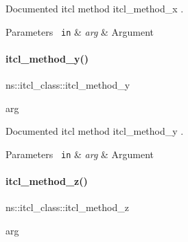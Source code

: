Documented itcl method {\ttfamily itcl\+\_\+method\+\_\+x} . 


\begin{DoxyParams}[1]{Parameters}
\mbox{\texttt{ in}}  & {\em arg} & Argument \\
\hline
\end{DoxyParams}

\begin{DoxyCode}{0}

\end{DoxyCode}
\mbox{\label{classns_1_1itcl__class_a092d0f8ed4796902e41fbeb1dfed82f1}} 
\paragraph{\texorpdfstring{itcl\_method\_y()}{itcl\_method\_y()}}
{\footnotesize\ttfamily ns\+::itcl\+\_\+class\+::itcl\+\_\+method\+\_\+y\begin{DoxyParamCaption}\item[{}]{arg  }\end{DoxyParamCaption}}



Documented itcl method {\ttfamily itcl\+\_\+method\+\_\+y} . 


\begin{DoxyParams}[1]{Parameters}
\mbox{\texttt{ in}}  & {\em arg} & Argument \\
\hline
\end{DoxyParams}

\begin{DoxyCode}{0}

\end{DoxyCode}
\mbox{\label{classns_1_1itcl__class_a13a383c766e489814960345540106cc1}} 
\paragraph{\texorpdfstring{itcl\_method\_z()}{itcl\_method\_z()}}
{\footnotesize\ttfamily ns\+::itcl\+\_\+class\+::itcl\+\_\+method\+\_\+z\begin{DoxyParamCaption}\item[{}]{arg  }\end{DoxyParamCaption}}



